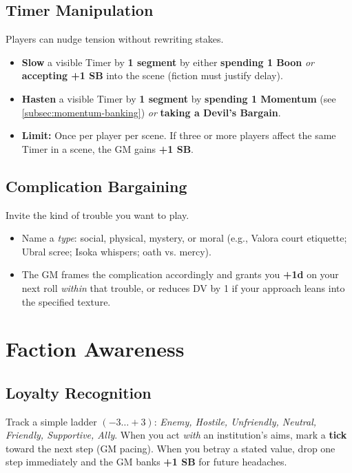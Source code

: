 \subsection{Timer Manipulation}
Players can nudge tension without rewriting stakes.
\begin{itemize}
  \item \textbf{Slow} a visible Timer by \textbf{1 segment} by either \textbf{spending 1 Boon} \emph{or} \textbf{accepting +1 SB} into the scene (fiction must justify delay).
  \item \textbf{Hasten} a visible Timer by \textbf{1 segment} by \textbf{spending 1 Momentum} (see \ref{subsec:momentum-banking}) \emph{or} \textbf{taking a Devil's Bargain}.
  \item \textbf{Limit:} Once per player per scene. If three or more players affect the same Timer in a scene, the GM gains \textbf{+1 SB}.
\end{itemize}

\subsection{Complication Bargaining}
Invite the kind of trouble you want to play.
\begin{itemize}
  \item Name a \emph{type}: social, physical, mystery, or moral (e.g., Valora court etiquette; Ubral scree; Isoka whispers; oath vs. mercy).
  \item The GM frames the complication accordingly and grants you \textbf{+1d} on your next roll \emph{within} that trouble, or reduces DV by 1 if your approach leans into the specified texture.
\end{itemize}

\section{Faction Awareness}

\subsection{Loyalty Recognition}
Track a simple ladder \((-3\ldots+3)\): \textit{Enemy, Hostile, Unfriendly, Neutral, Friendly, Supportive, Ally}. When you act \emph{with} an institution's aims, mark a \textbf{tick} toward the next step (GM pacing). When you betray a stated value, drop one step immediately and the GM banks \textbf{+1 SB} for future headaches.

